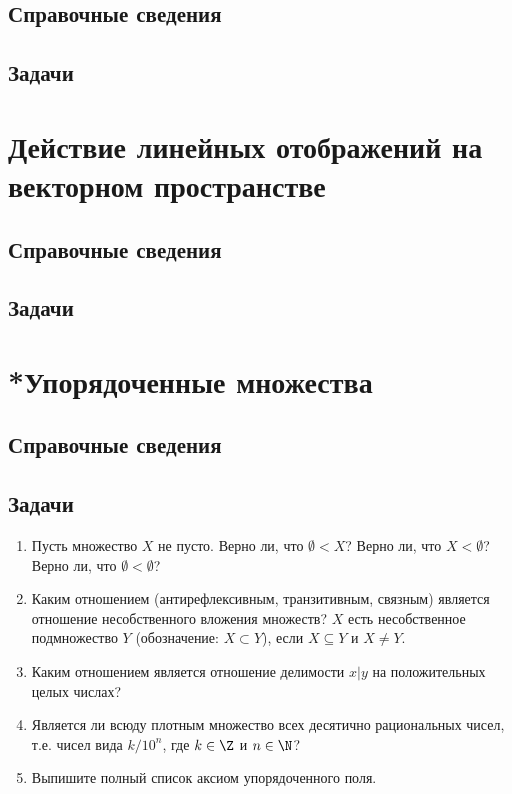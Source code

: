 \subsection*{Справочные сведения}

\subsection*{Задачи}




\section{Действие линейных отображений на векторном пространстве}

\subsection*{Справочные сведения}

\subsection*{Задачи}



\begin{comment}
\chapter{14. Алгебраические числа}
\end{comment}


\section{*Упорядоченные множества}\label{Ordering}

\subsection*{Справочные сведения}

\subsection*{Задачи}

\begin{enumerate}
\item Пусть множество $X$ не пусто. Верно ли, что $\emptyset<X$? Верно ли, что $X<\emptyset$? Верно ли, что $\emptyset<\emptyset$?
\item Каким отношением (антирефлексивным, транзитивным, связным) является отношение несобственного вложения множеств? $X$ есть несобственное подмножество $Y$ (обозначение: $X\subset Y$), если $X\subseteq Y$ и $X\ne Y$.
\item Каким отношением является отношение делимости $x|y$ на положительных целых числах?
\item Является ли всюду плотным множество всех десятично рациональных чисел, т.е. чисел вида $k/10^n$, где $k\in \Z$ и $n\in\N$?
\item Выпишите полный список аксиом упорядоченного поля.
\end{enumerate}


